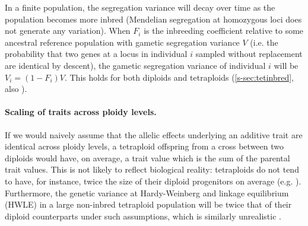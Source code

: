 \documentclass[12pt,a4paper]{article}
\begin{document}
    In a finite population, the segregation variance will decay over time as the
    population becomes more inbred (Mendelian segregation at homozygous loci does
    not generate any variation).
    When $F_i$ is the inbreeding coefficient relative to some ancestral reference
    population with gametic segregation variance $V$ (i.e. the probability that two
    genes at a locus in individual $i$ sampled without replacement are identical by
    descent), the gametic segregation variance of individual $i$ will be
    $V_i = (1-F_i)V$.
    This holds for both diploids and tetraploids (\cref{s-sec:tetinbred}, also
    \cite{moody1993}). 

    \paragraph{Scaling of traits across ploidy levels.}

    If we would naively assume that the allelic effects underlying an additive
    trait are identical across ploidy levels, 
    a tetraploid offspring from a cross between two diploids would have, on average,
    a trait value which is the sum of the parental trait values.
    This is not likely to reflect biological reality: tetraploids do not tend to
    have, for instance, twice the size of their diploid progenitors on average
    (e.g. \cite{porturas2019}).
    Furthermore, the genetic variance at Hardy-Weinberg and linkage equilibrium
    (HWLE) in a large non-inbred tetraploid population will be twice that of their
    diploid counterparts under such assumptions, which is similarly unrealistic
    \citep{clo2022}.
\end{document}
